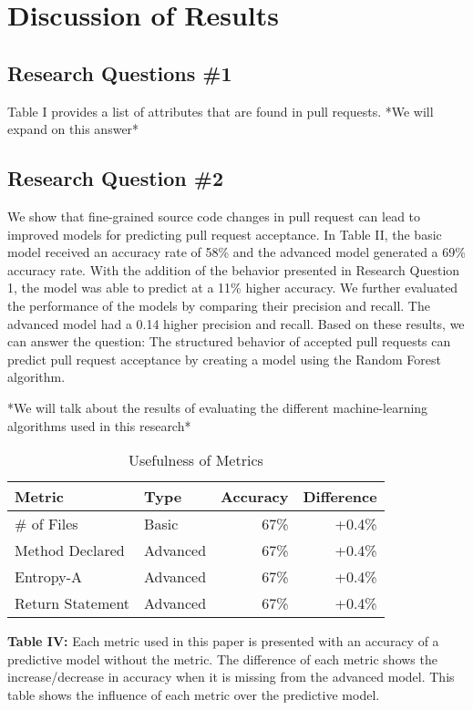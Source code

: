 \documentclass[10pt, conference]{IEEEtran}
\begin{document}
\section{Discussion of Results}
\subsection{Research Questions \#1}
Table I provides a list of attributes that are found in pull requests. *We will expand on this answer*

\subsection{Research Question \#2}
We show that fine-grained source code changes in pull request can lead to improved models for predicting pull request acceptance. In Table II, the basic model received an accuracy rate of 58\% and the advanced model generated a 69\% accuracy rate. With the addition of the behavior presented in Research Question 1, the model was able to predict at a 11\% higher accuracy. We further evaluated the performance of the models by comparing their precision and recall. The advanced model had a 0.14 higher precision and recall. Based on these results, we can answer the question: The structured behavior of accepted pull requests can predict pull request acceptance by creating a model using the Random Forest algorithm.

*We will talk about the results of evaluating the different machine-learning algorithms used in this research*

\begin{table}[h!]
  \centering
  \caption{ Usefulness of Metrics}
  \label{tab:Figure VI}
  \begin{tabular}{l|lrr}
    \toprule
    \textbf {Metric} & \textbf{Type} & \textbf{Accuracy} & \textbf{Difference}\\ %
    \midrule
    \# of Files & Basic & 67\% & +0.4\%\\ %
    Method Declared & Advanced & 67\% & +0.4\%\\ %
   Entropy-A & Advanced & 67\% & +0.4\%\\%
    Return Statement & Advanced & 67\% & +0.4\%\\ %
    \bottomrule
  \end{tabular}
  \break
  \break
\textbf{Table IV:} Each metric used in this paper is presented with an accuracy of a predictive model without the metric. The difference of each metric shows the increase/decrease in accuracy when it is missing from the advanced model. This table shows the influence of each metric over the predictive model.
\end{table}
\end{document}
